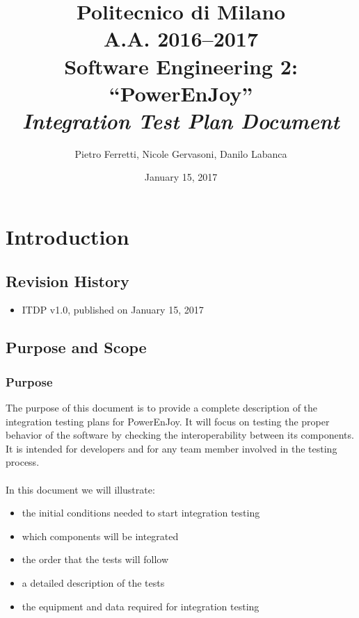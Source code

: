 \documentclass[english]{article}
\begin{document}
\title{Politecnico di Milano\\
 A.A. 2016–2017 \\
Software Engineering 2: “PowerEnJoy” \\
\emph{\textbf{Integration Test Plan Document}}}

\author{Pietro Ferretti, Nicole Gervasoni, Danilo Labanca}
\date{January 15, 2017}
\maketitle

\newpage

\tableofcontents{}

\newpage

\section{Introduction}

\subsection{Revision History}
\begin{itemize}
	\item{ITDP v1.0, published on January 15, 2017}
\end{itemize}
\subsection{Purpose and Scope}

\subsubsection{Purpose}
The purpose of this document is to provide a complete description of the integration testing plans for PowerEnJoy. It will focus on testing the proper behavior of the software by checking the 
interoperability between its components.
It is intended for developers and for any team member involved in the testing process.

\paragraph{}
In this document we will illustrate:
\begin{itemize}
	\item	the initial conditions needed to start integration testing
	\item	which components will be integrated
	\item	the order that the tests will follow
	\item	a detailed description of the tests
	\item	the equipment and data required for integration testing
\end{itemize}
\end{document}
